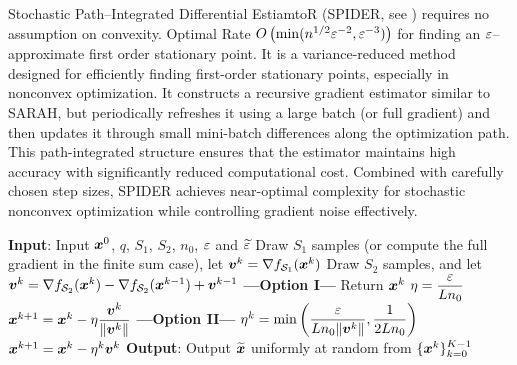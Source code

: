 Stochastic Path--Integrated Differential EstiamtoR (SPIDER, see \cite{SPIDERpaper}) requires no assumption on convexity. Optimal Rate $O\left(\min(n^{1/2}\varepsilon^{-2}, \varepsilon^{-3})\right)$ for 
finding an $\varepsilon$--approximate first order stationary point. It is a variance-reduced method designed for efficiently finding first-order stationary points, especially in nonconvex optimization. It constructs a recursive gradient estimator similar to SARAH, but periodically refreshes it using a large batch (or full gradient) and then updates it through small mini-batch differences along the optimization path. This path-integrated structure ensures that the estimator maintains high accuracy with significantly reduced computational cost. Combined with carefully chosen step sizes, SPIDER achieves near-optimal complexity for stochastic nonconvex optimization while controlling gradient noise effectively.

\begin{algorithm}[H]
\caption{Stochastic Path--Integrated Differential EstiamtoR (SPIDER): Searching First Order stationary point}
\label{Alg:SPIDER}
\begin{algorithmic}[1]
\STATE \textbf{Input}: Input $\boldsymbol{x}^0$, $q$, $S_1$, $S_2$, $n_0$, $\varepsilon$ and $\widetilde{\varepsilon}$
        \STATE Draw $S_1$ samples (or compute the full gradient in the finite sum case), let $\boldsymbol{v}^k=\nabla f_{\mathcal S_1}(\boldsymbol{x}^k)$ 
    \ELSE
        \STATE Draw $S_2$ samples, and let $\boldsymbol{v}^k=\nabla f_{\mathcal S_2}(\boldsymbol{x}^k)-\nabla f_{\mathcal S_2}(\boldsymbol{x}^{k-1})+\boldsymbol{v}^{k-1}$
    \ENDIF
    \STATE \textbf{---Option I---}
            \STATE Return $\boldsymbol{x}^k$
        \ELSE 
            \STATE $\eta =\dfrac{\varepsilon}{L n_0}$
            \STATE $\boldsymbol{x}^{k+1}=\boldsymbol{x}^k-\eta \dfrac{\boldsymbol{v}^k}{\|\boldsymbol{v}^k\|}$
        \ENDIF
    \STATE \textbf{---Option II---}
        \STATE $\eta^k =\min\left(\dfrac{\varepsilon}{L n_0\|\boldsymbol{v}^k\|}, \dfrac{1}{2L n_0}\right)$
        \STATE $\boldsymbol{x}^{k+1}=\boldsymbol{x}^k-\eta^k \boldsymbol{v}^k$
\ENDFOR
\STATE \textbf{Output}: Output $\widetilde{\boldsymbol{x}}$ uniformly at random from $\{\boldsymbol{x}^k\}_{k=0}^{K-1}$
\end{algorithmic}
\end{algorithm}


